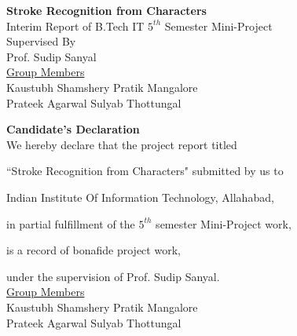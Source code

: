 \documentclass[10pt]{article}
\begin{document}
	\newpage
	\begin{center}
		\Huge \textbf{Stroke Recognition from Characters}
		\\[180pt]
		\Large Interim Report of B.Tech IT $5^{th}$ Semester Mini-Project
		\\[100pt]
		\Large Supervised By\\Prof. Sudip Sanyal
		\\[100pt]
		\underline{Group Members}
		\\[20pt]
		Kaustubh Shamshery \hspace{40pt} Pratik Mangalore\\Prateek Agarwal \hspace{60pt}Sulyab Thottungal     
	\end{center}
	\large
	\newpage
	\begin{center}
		\Huge \textbf{Candidate's Declaration}
		\\[120pt]
		\Large
		We hereby declare that the project report titled
		
		``Stroke Recognition from Characters" submitted by us to
		
		Indian Institute Of Information Technology, Allahabad,
		
		in partial fulfillment of the $5^{th}$ semester Mini-Project work,
		
		is a record of bonafide project work, 
		
		under the supervision of Prof. Sudip Sanyal.
		\\[100pt]
		\underline{Group Members}
		\\[50pt]
		Kaustubh Shamshery \hspace{40pt} Pratik Mangalore\\[50pt] Prateek Agarwal \hspace{60pt}Sulyab Thottungal
	\end{center}
	\newpage
\end{document}
